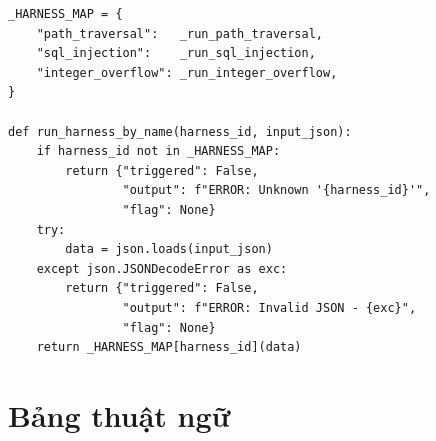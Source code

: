 \documentclass{nt521report}
\begin{document}
\begin{lstlisting}[style=Python, caption={test\_harness.py -- Dispatcher test harness}, basicstyle=\ttfamily\scriptsize]
_HARNESS_MAP = {
    "path_traversal":   _run_path_traversal,
    "sql_injection":    _run_sql_injection,
    "integer_overflow": _run_integer_overflow,
}

def run_harness_by_name(harness_id, input_json):
    if harness_id not in _HARNESS_MAP:
        return {"triggered": False,
                "output": f"ERROR: Unknown '{harness_id}'",
                "flag": None}
    try:
        data = json.loads(input_json)
    except json.JSONDecodeError as exc:
        return {"triggered": False,
                "output": f"ERROR: Invalid JSON - {exc}",
                "flag": None}
    return _HARNESS_MAP[harness_id](data)
\end{lstlisting}


\chapter{Bảng thuật ngữ}
\label{app:glossary}
\end{document}
